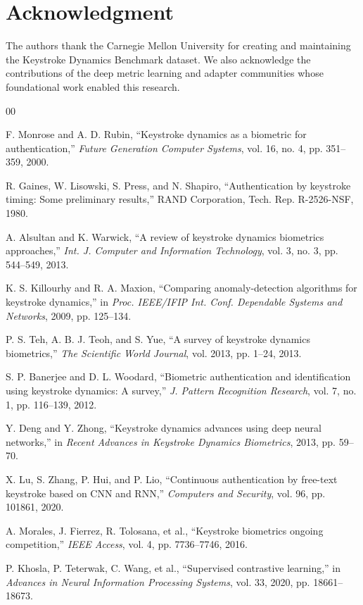 \documentclass{ieeeaccess}
\begin{document}
{\section*{Acknowledgment}
The authors thank the Carnegie Mellon University for creating and maintaining the Keystroke Dynamics Benchmark dataset. We also acknowledge the contributions of the deep metric learning and adapter communities whose foundational work enabled this research.

\begin{thebibliography}{00}

 F. Monrose and A. D. Rubin, ``Keystroke dynamics as a biometric for authentication,'' \emph{Future Generation Computer Systems}, vol. 16, no. 4, pp. 351--359, 2000.

 R. Gaines, W. Lisowski, S. Press, and N. Shapiro, ``Authentication by keystroke timing: Some preliminary results,'' RAND Corporation, Tech. Rep. R-2526-NSF, 1980.

 A. Alsultan and K. Warwick, ``A review of keystroke dynamics biometrics approaches,'' \emph{Int. J. Computer and Information Technology}, vol. 3, no. 3, pp. 544--549, 2013.

 K. S. Killourhy and R. A. Maxion, ``Comparing anomaly-detection algorithms for keystroke dynamics,'' in \emph{Proc. IEEE/IFIP Int. Conf. Dependable Systems and Networks}, 2009, pp. 125--134.

 P. S. Teh, A. B. J. Teoh, and S. Yue, ``A survey of keystroke dynamics biometrics,'' \emph{The Scientific World Journal}, vol. 2013, pp. 1--24, 2013.

 S. P. Banerjee and D. L. Woodard, ``Biometric authentication and identification using keystroke dynamics: A survey,'' \emph{J. Pattern Recognition Research}, vol. 7, no. 1, pp. 116--139, 2012.

 Y. Deng and Y. Zhong, ``Keystroke dynamics advances using deep neural networks,'' in \emph{Recent Advances in Keystroke Dynamics Biometrics}, 2013, pp. 59--70.

 X. Lu, S. Zhang, P. Hui, and P. Lio, ``Continuous authentication by free-text keystroke based on CNN and RNN,'' \emph{Computers and Security}, vol. 96, pp. 101861, 2020.

 A. Morales, J. Fierrez, R. Tolosana, et al., ``Keystroke biometrics ongoing competition,'' \emph{IEEE Access}, vol. 4, pp. 7736--7746, 2016.

 P. Khosla, P. Teterwak, C. Wang, et al., ``Supervised contrastive learning,'' in \emph{Advances in Neural Information Processing Systems}, vol. 33, 2020, pp. 18661--18673.


\end{thebibliography}}
\end{document}
